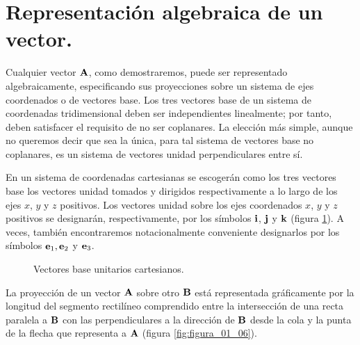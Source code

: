 \section{Representación algebraica de un vector.}

Cualquier vector $\vb{A}$, como demostraremos, puede ser representado algebraicamente, especificando sus proyecciones sobre un sistema de ejes 
coordenados o de vectores base. Los tres vectores base de un sistema de coordenadas tridimensional deben ser independientes linealmente; por 
tanto, deben satisfacer el requisito de no ser coplanares. La elección más simple, aunque no queremos decir que sea la única, para tal sistema de vectores base no coplanares, es un sistema de vectores unidad perpendiculares entre sí. 
\par
En un sistema de coordenadas cartesianas se escogerán como los tres vectores base los vectores unidad tomados y dirigidos respectivamente a lo 
largo de los ejes $x$, $y$ y $z$ positivos. Los vectores unidad sobre los ejes coordenados $x$, $y$ y $z$ positivos se designarán, respectivamente, por los símbolos $\vb{i}$, $\vb{j}$ y $\vb{k}$ (figura \ref{fig:figura_01_05}). A veces, también encontraremos notacionalmente conveniente designarlos por los símbolos $\vb{e}_{1}, \vb{e}_{2}$ y $\vb{e}_{3}$.
\begin{figure}[H]
    \centering
    \caption{Vectores base unitarios cartesianos.}
    \label{fig:figura_01_05}
\end{figure}
La proyección de un vector $\vb{A}$ sobre otro $\vb{B}$ está representada gráficamente por la longitud del segmento rectilíneo comprendido entre la intersección de una recta paralela a $\vb{B}$ con las perpendiculares a la dirección de $\vb{B}$ desde la cola y la punta de la flecha que representa a $\vb{A}$ (figura \ref{fig:figura_01_06}).
